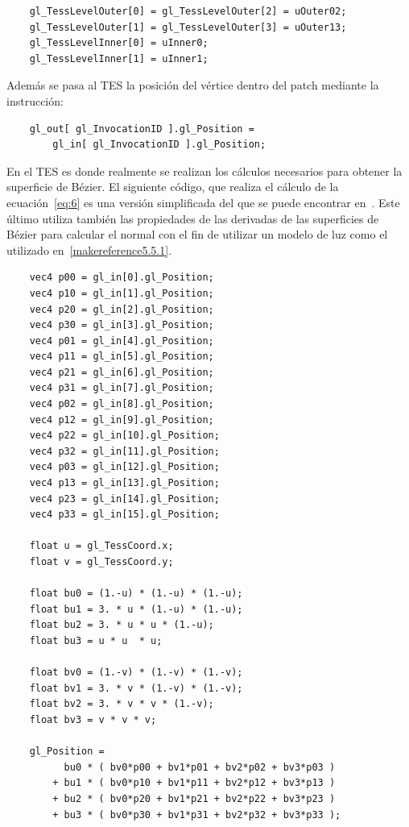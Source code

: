 \begin{verbatim}
    gl_TessLevelOuter[0] = gl_TessLevelOuter[2] = uOuter02;
    gl_TessLevelOuter[1] = gl_TessLevelOuter[3] = uOuter13;
    gl_TessLevelInner[0] = uInner0;
    gl_TessLevelInner[1] = uInner1;
\end{verbatim}

Además se pasa al TES la posición del vértice dentro del patch mediante la
instrucción:

\begin{verbatim}
    gl_out[ gl_InvocationID ].gl_Position =
        gl_in[ gl_InvocationID ].gl_Position;
\end{verbatim}

En el TES es donde realmente se realizan los cálculos necesarios para obtener la
superficie de Bézier. El siguiente código, que realiza el cálculo de la
ecuación~\eqref{eq:6} es una versión simplificada del que se puede encontrar
en~\citet{Bailey}. Este último utiliza también las propiedades de las derivadas
de las superficies de Bézier para calcular el normal con el fin de utilizar un
modelo de luz como el utilizado en~\ref{makereference5.5.1}.

\begin{verbatim}
    vec4 p00 = gl_in[0].gl_Position;
    vec4 p10 = gl_in[1].gl_Position;
    vec4 p20 = gl_in[2].gl_Position;
    vec4 p30 = gl_in[3].gl_Position;
    vec4 p01 = gl_in[4].gl_Position;
    vec4 p11 = gl_in[5].gl_Position;
    vec4 p21 = gl_in[6].gl_Position;
    vec4 p31 = gl_in[7].gl_Position;
    vec4 p02 = gl_in[8].gl_Position;
    vec4 p12 = gl_in[9].gl_Position;
    vec4 p22 = gl_in[10].gl_Position;
    vec4 p32 = gl_in[11].gl_Position;
    vec4 p03 = gl_in[12].gl_Position;
    vec4 p13 = gl_in[13].gl_Position;
    vec4 p23 = gl_in[14].gl_Position;
    vec4 p33 = gl_in[15].gl_Position;
    
    float u = gl_TessCoord.x;
    float v = gl_TessCoord.y;
    
    float bu0 = (1.-u) * (1.-u) * (1.-u);
    float bu1 = 3. * u * (1.-u) * (1.-u);
    float bu2 = 3. * u * u * (1.-u);
    float bu3 = u * u  * u;
    
    float bv0 = (1.-v) * (1.-v) * (1.-v);
    float bv1 = 3. * v * (1.-v) * (1.-v);
    float bv2 = 3. * v * v * (1.-v);
    float bv3 = v * v * v;
    
    gl_Position = 
          bu0 * ( bv0*p00 + bv1*p01 + bv2*p02 + bv3*p03 )
        + bu1 * ( bv0*p10 + bv1*p11 + bv2*p12 + bv3*p13 )
        + bu2 * ( bv0*p20 + bv1*p21 + bv2*p22 + bv3*p23 )
        + bu3 * ( bv0*p30 + bv1*p31 + bv2*p32 + bv3*p33 );

\end{verbatim}

